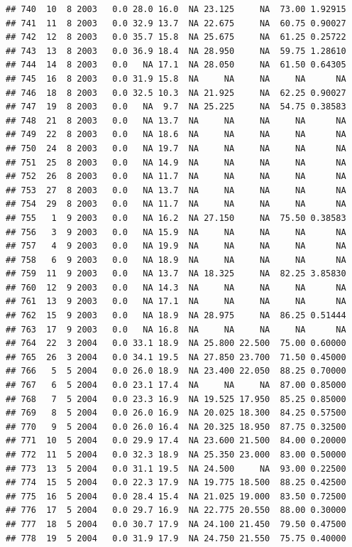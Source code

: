 \documentclass[
]{book}
\begin{document}
\begin{verbatim}
## 740  10  8 2003   0.0 28.0 16.0  NA 23.125     NA  73.00 1.92915
## 741  11  8 2003   0.0 32.9 13.7  NA 22.675     NA  60.75 0.90027
## 742  12  8 2003   0.0 35.7 15.8  NA 25.675     NA  61.25 0.25722
## 743  13  8 2003   0.0 36.9 18.4  NA 28.950     NA  59.75 1.28610
## 744  14  8 2003   0.0   NA 17.1  NA 28.050     NA  61.50 0.64305
## 745  16  8 2003   0.0 31.9 15.8  NA     NA     NA     NA      NA
## 746  18  8 2003   0.0 32.5 10.3  NA 21.925     NA  62.25 0.90027
## 747  19  8 2003   0.0   NA  9.7  NA 25.225     NA  54.75 0.38583
## 748  21  8 2003   0.0   NA 13.7  NA     NA     NA     NA      NA
## 749  22  8 2003   0.0   NA 18.6  NA     NA     NA     NA      NA
## 750  24  8 2003   0.0   NA 19.7  NA     NA     NA     NA      NA
## 751  25  8 2003   0.0   NA 14.9  NA     NA     NA     NA      NA
## 752  26  8 2003   0.0   NA 11.7  NA     NA     NA     NA      NA
## 753  27  8 2003   0.0   NA 13.7  NA     NA     NA     NA      NA
## 754  29  8 2003   0.0   NA 11.7  NA     NA     NA     NA      NA
## 755   1  9 2003   0.0   NA 16.2  NA 27.150     NA  75.50 0.38583
## 756   3  9 2003   0.0   NA 15.9  NA     NA     NA     NA      NA
## 757   4  9 2003   0.0   NA 19.9  NA     NA     NA     NA      NA
## 758   6  9 2003   0.0   NA 18.9  NA     NA     NA     NA      NA
## 759  11  9 2003   0.0   NA 13.7  NA 18.325     NA  82.25 3.85830
## 760  12  9 2003   0.0   NA 14.3  NA     NA     NA     NA      NA
## 761  13  9 2003   0.0   NA 17.1  NA     NA     NA     NA      NA
## 762  15  9 2003   0.0   NA 18.9  NA 28.975     NA  86.25 0.51444
## 763  17  9 2003   0.0   NA 16.8  NA     NA     NA     NA      NA
## 764  22  3 2004   0.0 33.1 18.9  NA 25.800 22.500  75.00 0.60000
## 765  26  3 2004   0.0 34.1 19.5  NA 27.850 23.700  71.50 0.45000
## 766   5  5 2004   0.0 26.0 18.9  NA 23.400 22.050  88.25 0.70000
## 767   6  5 2004   0.0 23.1 17.4  NA     NA     NA  87.00 0.85000
## 768   7  5 2004   0.0 23.3 16.9  NA 19.525 17.950  85.25 0.85000
## 769   8  5 2004   0.0 26.0 16.9  NA 20.025 18.300  84.25 0.57500
## 770   9  5 2004   0.0 26.0 16.4  NA 20.325 18.950  87.75 0.32500
## 771  10  5 2004   0.0 29.9 17.4  NA 23.600 21.500  84.00 0.20000
## 772  11  5 2004   0.0 32.3 18.9  NA 25.350 23.000  83.00 0.50000
## 773  13  5 2004   0.0 31.1 19.5  NA 24.500     NA  93.00 0.22500
## 774  15  5 2004   0.0 22.3 17.9  NA 19.775 18.500  88.25 0.42500
## 775  16  5 2004   0.0 28.4 15.4  NA 21.025 19.000  83.50 0.72500
## 776  17  5 2004   0.0 29.7 16.9  NA 22.775 20.550  88.00 0.30000
## 777  18  5 2004   0.0 30.7 17.9  NA 24.100 21.450  79.50 0.47500
## 778  19  5 2004   0.0 31.9 17.9  NA 24.750 21.550  75.75 0.40000

\end{verbatim}
\end{document}
